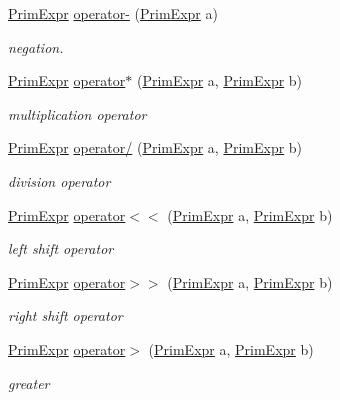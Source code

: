 \begin{DoxyCompactItemize}
\hyperlink{classtvm_1_1PrimExpr}{Prim\+Expr} \hyperlink{namespacetvm_abc417454badf61b154d6a8d87cd8f171}{operator-\/} (\hyperlink{classtvm_1_1PrimExpr}{Prim\+Expr} a)
\begin{DoxyCompactList}\small\item\em negation. \end{DoxyCompactList}\item 
\hyperlink{classtvm_1_1PrimExpr}{Prim\+Expr} \hyperlink{namespacetvm_a5c5034de2993b9130b7bd9d593a11bb5}{operator$\ast$} (\hyperlink{classtvm_1_1PrimExpr}{Prim\+Expr} a, \hyperlink{classtvm_1_1PrimExpr}{Prim\+Expr} b)
\begin{DoxyCompactList}\small\item\em multiplication operator \end{DoxyCompactList}\item 
\hyperlink{classtvm_1_1PrimExpr}{Prim\+Expr} \hyperlink{namespacetvm_a18256ba1213ce5ff3cf8037a314354b7}{operator/} (\hyperlink{classtvm_1_1PrimExpr}{Prim\+Expr} a, \hyperlink{classtvm_1_1PrimExpr}{Prim\+Expr} b)
\begin{DoxyCompactList}\small\item\em division operator \end{DoxyCompactList}\item 
\hyperlink{classtvm_1_1PrimExpr}{Prim\+Expr} \hyperlink{namespacetvm_af682776c3609284f1bc3ea436e21a67a}{operator$<$$<$} (\hyperlink{classtvm_1_1PrimExpr}{Prim\+Expr} a, \hyperlink{classtvm_1_1PrimExpr}{Prim\+Expr} b)
\begin{DoxyCompactList}\small\item\em left shift operator \end{DoxyCompactList}\item 
\hyperlink{classtvm_1_1PrimExpr}{Prim\+Expr} \hyperlink{namespacetvm_a1ce1eb32fc9d76ebe5a6b8d185024d41}{operator$>$$>$} (\hyperlink{classtvm_1_1PrimExpr}{Prim\+Expr} a, \hyperlink{classtvm_1_1PrimExpr}{Prim\+Expr} b)
\begin{DoxyCompactList}\small\item\em right shift operator \end{DoxyCompactList}\item 
\hyperlink{classtvm_1_1PrimExpr}{Prim\+Expr} \hyperlink{namespacetvm_ad93d00f7b080dc3f905f5c34c170a041}{operator$>$} (\hyperlink{classtvm_1_1PrimExpr}{Prim\+Expr} a, \hyperlink{classtvm_1_1PrimExpr}{Prim\+Expr} b)
\begin{DoxyCompactList}\small\item\em greater \end{DoxyCompactList}\item 

\end{DoxyCompactItemize}
